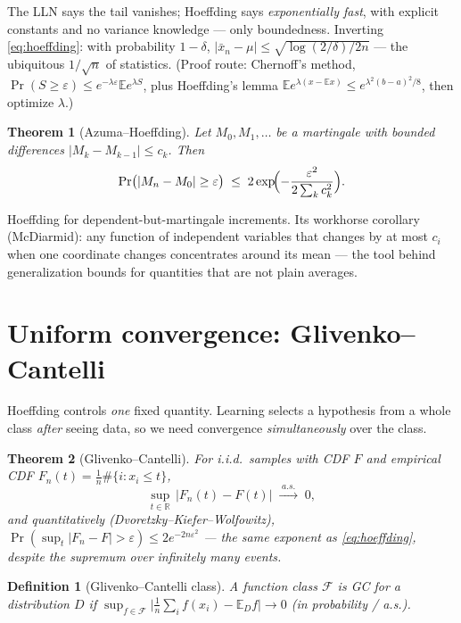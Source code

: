 \documentclass[11pt]{article}
\newtheorem{theorem}{Theorem}
\newtheorem{definition}{Definition}
\begin{document}
The LLN says the tail vanishes; Hoeffding says \emph{exponentially fast},
with explicit constants and no variance knowledge --- only boundedness.
Inverting \eqref{eq:hoeffding}: with probability $1-\delta$,
$|\bar x_n - \mu| \le \sqrt{\log(2/\delta)/2n}$ --- the ubiquitous
$1/\sqrt{n}$ of statistics. (Proof route: Chernoff's method,
$\Pr(S\ge\varepsilon) \le e^{-\lambda\varepsilon}\mathbb{E}e^{\lambda S}$,
plus Hoeffding's lemma $\mathbb{E}e^{\lambda(x-\mathbb{E}x)} \le
e^{\lambda^2(b-a)^2/8}$, then optimize $\lambda$.)

\begin{theorem}[Azuma--Hoeffding]
Let $M_0, M_1, \dots$ be a martingale with bounded differences
$|M_k - M_{k-1}| \le c_k$. Then
\begin{equation}
  \Pr\bigl(|M_n - M_0| \ge \varepsilon\bigr)
  \;\le\; 2\exp\!\Bigl(-\frac{\varepsilon^2}{2\sum_k c_k^2}\Bigr).
  \label{eq:azuma}
\end{equation}
\end{theorem}

Hoeffding for dependent-but-martingale increments. Its workhorse corollary
(McDiarmid): any function of independent variables that changes by at most
$c_i$ when one coordinate changes concentrates around its mean --- the
tool behind generalization bounds for quantities that are not plain
averages.

\section{Uniform convergence: Glivenko--Cantelli}

Hoeffding controls \emph{one} fixed quantity. Learning selects a
hypothesis from a whole class \emph{after} seeing data, so we need
convergence \emph{simultaneously} over the class.

\begin{theorem}[Glivenko--Cantelli]
For i.i.d.\ samples with CDF $F$ and empirical CDF
$F_n(t) = \tfrac1n\#\{i : x_i \le t\}$,
\begin{equation}
  \sup_{t\in\mathbb{R}}\, \bigl|F_n(t) - F(t)\bigr|
  \;\xrightarrow{\;a.s.\;}\; 0 ,
  \label{eq:gc}
\end{equation}
and quantitatively (Dvoretzky--Kiefer--Wolfowitz),
$\Pr(\sup_t |F_n - F| > \varepsilon) \le 2e^{-2n\varepsilon^2}$ --- the
same exponent as \eqref{eq:hoeffding}, despite the supremum over
infinitely many events.
\end{theorem}

\begin{definition}[Glivenko--Cantelli class]
A function class $\mathcal{F}$ is GC for a distribution $D$ if
$\sup_{f\in\mathcal{F}} \bigl|\tfrac1n\sum_i f(x_i) -
\mathbb{E}_D f\bigr| \to 0$ (in probability / a.s.).
\end{definition}
\end{document}
